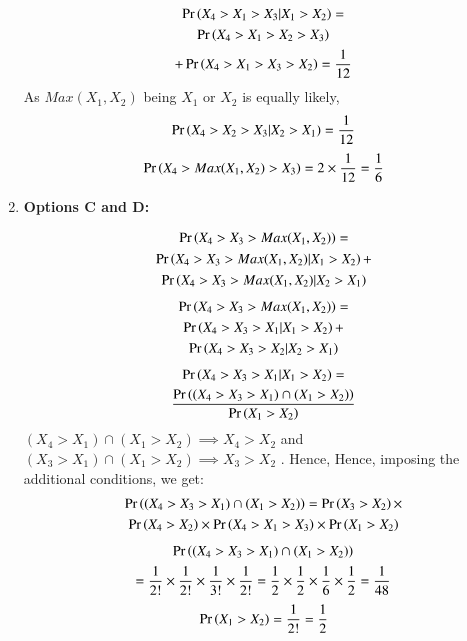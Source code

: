 \documentclass[journal,12pt,twocolumn]{IEEEtran}
\begin{document}
\begin{enumerate}
\begin{multline}
    \Pr\left(X_4 > X_1 > X_3 | X_1 > X_2 \right) = \\\Pr\left(X_4 > X_1 > X_2> X_3\right) \\+\Pr\left(X_4 > X_1 > X_3 > X_2\right)
= \frac{1}{12}
\end{multline}
As $Max(X_1,X_2)$ being $X_1$ or $X_2$ is equally likely,
\begin{align}
\Pr\left(X_4 > X_2 > X_3| X_2 > X_1\right) = \frac{1}{12}
\end{align}
\begin{align}
\Pr\left(X_4 > Max(X_1,X_2) > X_3\right) = 2 \times \frac{1}{12} = \frac{1}{6}
\end{align}

\item \textbf{Options C and D:} 

\begin{multline}
    \Pr\left(X_4 > X_3 > Max(X_1,X_2)\right) = \\\Pr\left(X_4 > X_3 > Max(X_1,X_2)| X_1>X_2\right) + \\\Pr\left(X_4 > X_3 > Max(X_1,X_2)| X_2>X_1\right)
\end{multline}
\begin{multline}
    \Pr\left(X_4 > X_3 > Max(X_1,X_2)\right) = \\\Pr\left(X_4 > X_3 > X_1| X_1>X_2\right) + \\\Pr\left(X_4 > X_3 > X_2| X_2>X_1\right)
\end{multline}
\begin{multline}
    \Pr\left(X_4 > X_3 > X_1 | X_1 > X_2 \right) = \\ \frac{\Pr\left((X_4 > X_3 > X_1) \cap (X_1 > X_2) \right)}{\Pr\left(X_1>X_2\right)} \label{defn_CD}
\end{multline}
 $(X_4>X_1) \cap (X_1>X_2) \implies X_4>X_2$ and $(X_3>X_1) \cap (X_1>X_2) \implies X_3>X_2$ . Hence, Hence, imposing the additional conditions, we get:
\begin{multline}
    \Pr\left((X_4 > X_3 > X_1) \cap (X_1 > X_2)\right) = \Pr\left(X_3>X_2\right) \times \\\Pr\left(X_4>X_2\right) \times \Pr\left(X_4 > X_1 > X_3\right) \times \Pr\left(X_1 > X_2\right)
\end{multline}
\begin{multline}
 \Pr\left((X_4 > X_3 > X_1) \cap (X_1 > X_2)\right)\\
    = \frac{1}{2!}\times \frac{1}{2!}\times \frac{1}{3!}\times \frac{1}{2!}
    = \frac{1}{2}\times \frac{1}{2}\times \frac{1}{6}\times \frac{1}{2}= \frac{1}{48} \label{NR_CD}
\end{multline}
\begin{align}
    \pr{X_1>X_2} = \frac{1}{2!} = \frac{1}{2} \label{DR_CD}

\end{align}
\end{enumerate}
\end{document}
